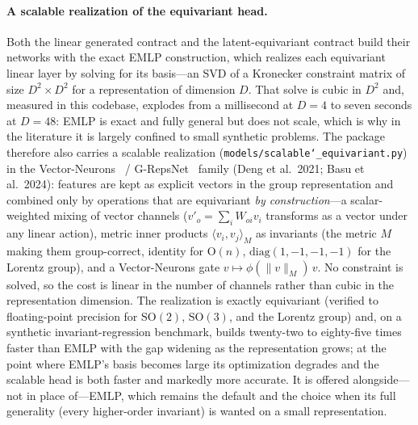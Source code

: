 \documentclass[11pt]{article}
\newcommand{\allowbreakhere}{\discretionary{}{}{}}
\newcommand{\code}[1]{\texttt{\def\_{\char`_\allowbreakhere}#1}}
\begin{document}
\paragraph{A scalable realization of the equivariant head.} Both the linear generated contract and the
latent-equivariant contract build their networks with the exact EMLP construction, which realizes each
equivariant linear layer by solving for its basis---an SVD of a Kronecker constraint matrix of size $D^2\times
D^2$ for a representation of dimension $D$. That solve is cubic in $D^2$ and, measured in this codebase,
explodes from a millisecond at $D=4$ to seven seconds at $D=48$: EMLP is exact and fully general but does not
scale, which is why in the literature it is largely confined to small synthetic problems. The package
therefore also carries a scalable realization
(\code{models/scalable\_equivariant.py}) in the Vector-Neurons~\cite{deng2021vn} / G-RepsNet~\cite{basu2023grepsnet} family (Deng et al.\ 2021; Basu et
al.\ 2024): features are kept as explicit vectors in the group representation and combined only by operations
that are equivariant \emph{by construction}---a scalar-weighted mixing of vector channels
($v'_o=\sum_i W_{oi}v_i$ transforms as a vector under any linear action), metric inner products
$\langle v_i,v_j\rangle_M$ as invariants (the metric $M$ making them group-correct, identity for $\mathrm{O}(n)$,
$\mathrm{diag}(1,-1,-1,-1)$ for the Lorentz group), and a Vector-Neurons gate $v\mapsto\phi(\|
v\|_M)\,v$. No constraint is solved, so the cost is linear in the number of channels rather than cubic in
the representation dimension. The realization is exactly equivariant (verified to floating-point precision for
$\mathrm{SO}(2)$, $\mathrm{SO}(3)$, and the Lorentz group) and, on a synthetic invariant-regression benchmark,
builds twenty-two to eighty-five times faster than EMLP with the gap widening as the representation grows; at
the point where EMLP's basis becomes large its optimization degrades and the scalable head is both faster and
markedly more accurate. It is offered alongside---not in place of---EMLP, which remains the default and the
choice when its full generality (every higher-order invariant) is wanted on a small representation.
\end{document}

